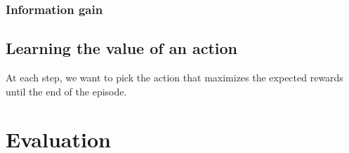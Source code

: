 \documentclass[runningheads]{llncs}
\begin{document}
\subsubsection{Information gain}

\subsection{Learning the value of an action}
At each step, we want to pick the action that maximizes the expected rewards until the end of the episode.

\section{Evaluation} \label{sec:evaluation}



\end{document}
